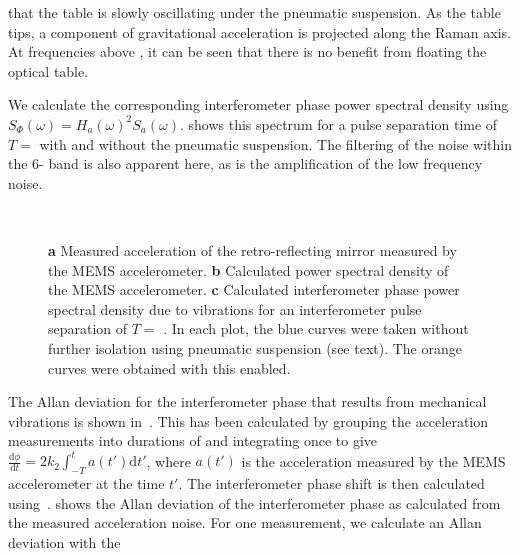 that the table is slowly oscillating under the pneumatic suspension.
As the table tips, a component of gravitational acceleration is
projected along the Raman axis. At frequencies above
, it can be seen that there is no benefit from
floating the optical table. 
\par\noindent
We calculate the corresponding interferometer phase power spectral
density using
$S_\Phi(\omega) = H_a(\omega)^2 S_a(\omega)$.
 shows this spectrum for a pulse
separation time of $T = $  with and
without the pneumatic suspension. The filtering of the noise within
the 6- band is also apparent here, as is the
amplification of the low frequency noise.  
\begin{figure}[htpb!]
  \centering
  \\
  \caption[Interferometer power spectral density due to vibration
  noise.]{\textbf{a} Measured acceleration of the retro-reflecting mirror
    measured by the MEMS accelerometer. \textbf{b} Calculated power
    spectral density of the MEMS accelerometer. \textbf{c} Calculated interferometer 
  phase power spectral density due to vibrations for an interferometer
pulse separation of $T = $ . In each plot, the blue
curves were taken without further isolation using pneumatic suspension
(see text). The orange curves were obtained with this enabled.} 
  \label{fig:vibration_spectrum}
\end{figure}
\par\noindent
The Allan deviation for the interferometer phase that results from
mechanical vibrations is shown
in~. This has been calculated by
grouping the acceleration measurements into durations of
 and integrating once to give
$\frac{\mathrm{d}\phi}{\mathrm{d} t} = 2 k_2 \int_{-T}^{t} a(t')
\mathrm{d} t'$, where $a(t')$ is the acceleration measured by the MEMS
accelerometer at the time $t'$. The interferometer phase shift is then
calculated using~. 
 shows the Allan
deviation of the interferometer phase as calculated from the measured
acceleration noise. 
For one measurement, we calculate an Allan deviation with the
